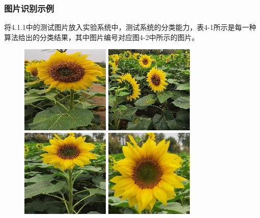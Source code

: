 \documentclass[supercite]{HustGraduPaper}
\begin{document}
\begin{sloppypar}
   \subsubsection{图片识别示例}
   将4.1.1中的测试图片放入实验系统中，测试系统的分类能力，表4-1所示是每一种算法给出的分类结果，其中图片编号对应图4-2中所示的图片。
   \begin{figure}[H]
    \begin{minipage}[t]{0.24\textwidth}
    \centering
     \includegraphics[scale=0.55]{te1.jpg}
     \end{minipage}
     \begin{minipage}[t]{0.24\textwidth}
     \centering
     \includegraphics[scale=0.55]{te2.jpg}
     \end{minipage}
     \begin{minipage}[t]{0.24\textwidth}
      \centering
      \includegraphics[scale=0.55]{te3.jpg}
      \end{minipage}
      \begin{minipage}[t]{0.24\textwidth}
        \centering
        \includegraphics[scale=0.73]{te4.jpg}

\end{minipage}
\end{figure}
\end{sloppypar}
\end{document}
